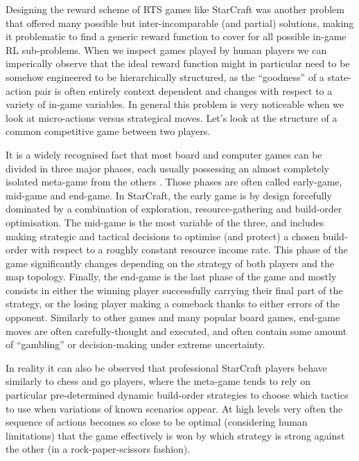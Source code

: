 Designing the reward scheme of RTS games like StarCraft was another problem that
offered many possible but inter-incomparable (and partial) solutions, making it
problematic to find a generic reward function to cover for all possible in-game
RL sub-problems. When we inspect games played by human players we can
imperically observe that the ideal reward function might in particular need to
be somehow engineered to be hierarchically structured, as the ``goodness'' of a
state-action pair is often entirely context dependent and changes with respect
to a variety of in-game variables. In general this problem is very noticeable
when we look at micro-actions versus strategical moves. Let's look at the
structure of a common competitive game between two players.

It is a widely recognised fact that most board and computer games can be divided
in three major phases, each usually possessing an almost completely isolated
meta-game from the others \citep{liquipediastrat}. Those phases are often called
early-game, mid-game and end-game. In StarCraft, the early game is by design
forcefully dominated by a combination of exploration, resource-gathering and
build-order optimisation. The mid-game is the most variable of the three, and
includes making strategic and tactical decisions to optimise (and protect) a
chosen build-order with respect to a roughly constant resource income rate. This
phase of the game significantly changes depending on the strategy of both
players and the map topology. Finally, the end-game is the last phase of the
game and mostly consists in either the winning player successfully carrying
their final part of the strategy, or the losing player making a comeback thanks
to either errors of the opponent. Similarly to other games and many popular
board games, end-game moves are often carefully-thought and executed, and often
contain some amount of ``gambling'' or decision-making under extreme
uncertainty.

In reality it can also be observed that professional StarCraft players behave
similarly to chess and go players, where the meta-game tends to rely on
particular pre-determined dynamic build-order strategies to choose which tactics
to use when variations of known scenarios appear. At high levels very often the
sequence of actions becomes so close to be optimal (considering human
limitations) that the game effectively is won by which strategy is strong
against the other (in a rock-paper-scissors fashion).

